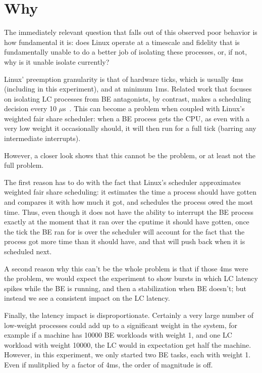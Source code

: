 \section{Why}\label{s:why}


The immediately relevant question that falls out of this observed poor behavior
is how fundamental it is: does Linux operate at a timescale and fidelity that is
fundamentally unable to do a better job of isolating these processes, or, if
not, why is it unable isolate currently?

Linux' preemption granularity is that of hardware ticks, which is usually 4ms
(including in this experiment), and at minimum 1ms. Related work that focuses on
isolating LC processes from BE antagonists, by contrast, makes a scheduling
decision every 10 $\mu$s~\cite{TODO}. This can become a problem when coupled
with Linux's weighted fair share scheduler: when a BE process gets the CPU, as
even with a very low weight it occasionally should, it will then run for a full
tick (barring any intermediate interrupts).

However, a closer look shows that this cannot be the problem, or at least not
the full problem. 

The first reason has to do with the fact that Linux's scheduler approximates
weighted fair share scheduling: it estimates the time a process should have
gotten and compares it with how much it got, and schedules the process owed the
most time. Thus, even though it does not have the ability to interrupt the BE
process exactly at the moment that it ran over the cputime it should have
gotten, once the tick the BE ran for is over the scheduler will account for the
fact that the process got more time than it should have, and that will push back
when it is scheduled next. 

A second reason why this can't be the whole problem is that if those 4ms were
the problem, we would expect the experiment to show bursts in which LC latency
spikes while the BE is running, and then a stabilization when BE doesn't; but
instead we see a consistent impact on the LC latency.

Finally, the latency impact is disproportionate. Certainly a very large number
of low-weight processes could add up to a significant weight in the system, for
example if a machine has 10000 BE workloads with weight 1, and one LC workload
with weight 10000, the LC would in expectation get half the machine. However, in
this experiment, we only started two BE tasks, each with weight 1. Even if
mulitplied by a factor of 4ms, the order of magnitude is off.

